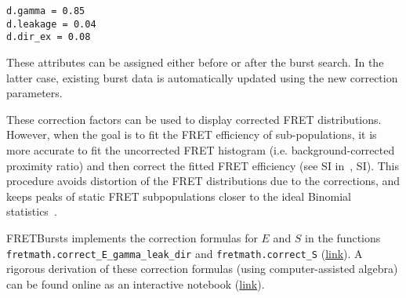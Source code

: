 \begin{lstlisting}
d.gamma = 0.85
d.leakage = 0.04
d.dir_ex = 0.08
\end{lstlisting}

These attributes can be assigned either before or after the burst search. In the
latter case, existing burst data is automatically updated using the new
correction parameters.

These correction factors can be used to display corrected FRET distributions.
However, when the goal is to fit the FRET efficiency of sub-populations, 
it is more accurate to fit the uncorrected FRET histogram (i.e. background-corrected
proximity ratio) and then correct the fitted FRET efficiency (see SI in~\cite{Lee_2005}, SI).
This procedure avoids 
distortion of the FRET distributions due to the corrections, and keeps peaks of
static FRET subpopulations closer to the ideal Binomial statistics~\cite{Gopich_2007}.

FRETBursts implements the correction formulas for $E$ and $S$ in the functions
\verb|fretmath.correct_E_gamma_leak_dir| and \verb|fretmath.correct_S|
(\href{http://fretbursts.readthedocs.org/en/latest/fretmath.html}{link}). 
A rigorous derivation of these correction formulas (using computer-assisted algebra) 
can be found online as an interactive notebook (\href{http://nbviewer.jupyter.org/github/tritemio/notebooks/blob/master/Derivation%20of%20FRET%20and%20S%20correction%20formulas.ipynb}{link}).
